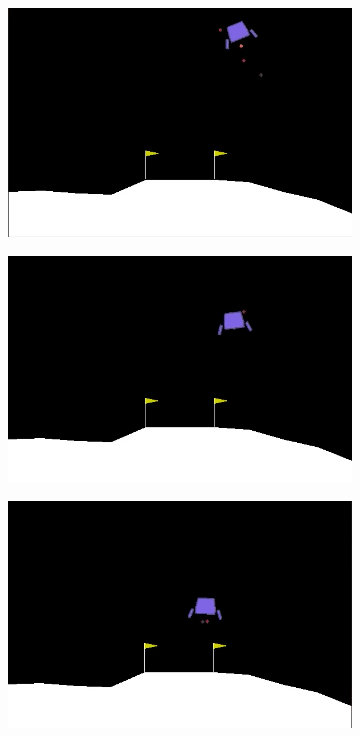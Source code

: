 \documentclass{article}
\begin{document}
\begin{figure}[!p]
\centering
  \begin{subfigure}{0.18\textwidth}
  \centering
  \includegraphics[width=\textwidth]{figures/lander/frame1}
  \caption{}
  \end{subfigure}
  \begin{subfigure}{0.18\textwidth}
  \centering
  \includegraphics[width=\textwidth]{figures/lander/frame2}
  \caption{}
  \end{subfigure}
  \begin{subfigure}{0.18\textwidth}
  \centering
  \includegraphics[width=\textwidth]{figures/lander/frame3}

\end{subfigure}
\end{figure}
\end{document}
